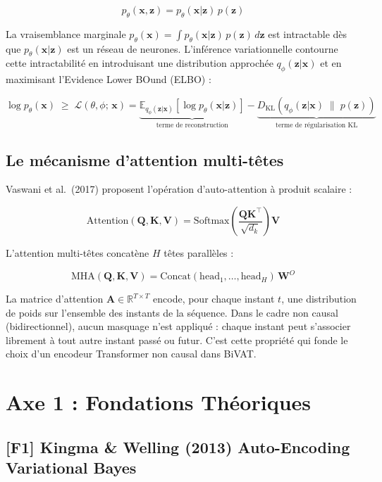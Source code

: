 \documentclass[12pt,a4paper]{article}
\begin{document}
$$p_\theta(\mathbf{x}, \mathbf{z}) = p_\theta(\mathbf{x}|\mathbf{z})\,p(\mathbf{z})$$

La vraisemblance marginale
$p_\theta(\mathbf{x}) = \int p_\theta(\mathbf{x}|\mathbf{z})\,p(\mathbf{z})\,
d\mathbf{z}$ est intractable dès que $p_\theta(\mathbf{x}|\mathbf{z})$ est un
réseau de neurones. L'inférence variationnelle contourne cette intractabilité
en introduisant une distribution approchée $q_\phi(\mathbf{z}|\mathbf{x})$ et
en maximisant l'Evidence Lower BOund (ELBO) :

$$\log p_\theta(\mathbf{x}) \;\geq\; \mathcal{L}(\theta, \phi;\,\mathbf{x})
= \underbrace{\mathbb{E}_{q_\phi(\mathbf{z}|\mathbf{x})}\!\left[
\log p_\theta(\mathbf{x}|\mathbf{z})\right]}_{\text{terme de reconstruction}}
- \underbrace{D_{\mathrm{KL}}\!\left(q_\phi(\mathbf{z}|\mathbf{x})
\;\|\; p(\mathbf{z})\right)}_{\text{terme de régularisation KL}}$$

\subsection{Le mécanisme d'attention multi-têtes}

Vaswani et al.\ (2017) proposent l'opération d'auto-attention à produit scalaire :

$$\mathrm{Attention}(\mathbf{Q}, \mathbf{K}, \mathbf{V}) =
\mathrm{Softmax}\!\left(\frac{\mathbf{Q}\mathbf{K}^\top}{\sqrt{d_k}}\right)\mathbf{V}$$

L'attention multi-têtes concatène $H$ têtes parallèles :

$$\mathrm{MHA}(\mathbf{Q},\mathbf{K},\mathbf{V}) =
\mathrm{Concat}(\mathrm{head}_1, \ldots, \mathrm{head}_H)\,\mathbf{W}^O$$

La matrice d'attention $\mathbf{A} \in \mathbb{R}^{T\times T}$ encode, pour
chaque instant $t$, une distribution de poids sur l'ensemble des instants de
la séquence. Dans le cadre non causal (bidirectionnel), aucun masquage n'est
appliqué : chaque instant peut s'associer librement à tout autre instant passé
ou futur. C'est cette propriété qui fonde le choix d'un encodeur Transformer
non causal dans BiVAT.

\section{Axe 1 : Fondations Théoriques}

\subsection{[F1] Kingma \& Welling (2013)  Auto-Encoding Variational Bayes}
\end{document}
